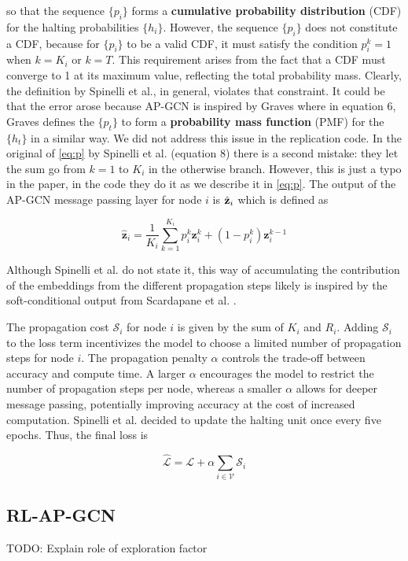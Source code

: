 \documentclass{gdl}
\begin{document}
\noindent so that the sequence $\{p_i\}$ forms a \textbf{cumulative probability distribution} (CDF) for the halting probabilities $\{h_i\}$. However, the sequence $\{p_i\}$ does not constitute a CDF, because for $\{p_i\}$ to be a valid CDF, it must satisfy the condition $p_i^k = 1$ when $k = K_i$ or $k = T$. This requirement arises from the fact that a CDF must converge to 1 at its maximum value, reflecting the total probability mass. Clearly, the definition by Spinelli et al., in general, violates that constraint. It could be that the error arose because AP-GCN is inspired by Graves \cite{graves2017} where in equation 6, Graves defines the $\{p_t\}$ to form a \textbf{probability mass function} (PMF) for the $\{h_t\}$ in a similar way. We did not address this issue in the replication code. In the original of \autoref{eq:p} by Spinelli et al. (equation 8) there is a second mistake: they let the sum go from $k=1$ to $K_i$ in the otherwise branch. However, this is just a typo in the paper, in the code they do it as we describe it in \autoref{eq:p}.
The output of the AP-GCN message passing layer for node $i$ is $\hat{\bf{z}}_i$ which is defined as

\begin{equation}
\hat{\mathbf{z}}_i = \frac{1}{K_i} \sum_{k=1}^{K_i} p_i^k \mathbf{z}^k_i + (1-p^k_i) \mathbf{z}_i^{k-1} 
\label{eq:aggregate}
\end{equation}

\noindent Although Spinelli et al. do not state it, this way of accumulating the contribution of the embeddings from the different propagation steps likely is inspired by the soft-conditional output from Scardapane et al. \cite{scardapane2020}.

 The propagation cost $\mathcal{S}_i$ for node $i$ is given by the sum of $K_i$ and $R_i$. Adding $\mathcal{S}_i$ to the loss term incentivizes the model to choose a limited number of propagation steps for node $i$. The propagation penalty $\alpha$ controls the trade-off between accuracy and compute time. A larger $\alpha$ encourages the model to restrict the number of propagation steps per node, whereas a smaller $\alpha$ allows for deeper message passing, potentially improving accuracy at the cost of increased computation. Spinelli et al. decided to update the halting unit once every five epochs. Thus, the final loss is

$$ \mathcal{\hat{L}} = \mathcal{L} + \alpha \sum_{i\in \mathcal{V}} \mathcal{S}_i $$


\subsection{RL-AP-GCN}
TODO: Explain role of exploration factor
\end{document}
